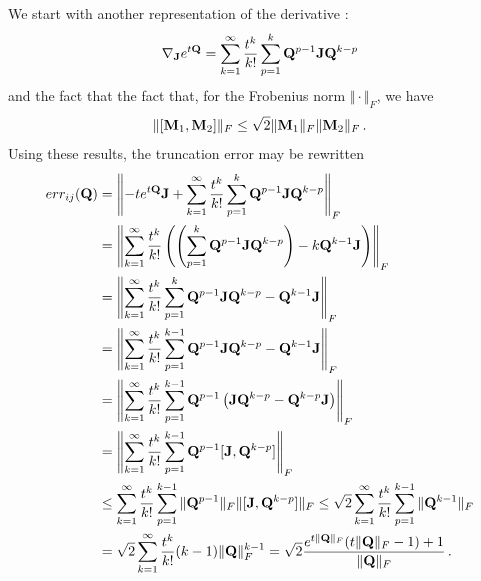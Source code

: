\documentclass[12pt]{article} %
\begin{document}
We start with another representation of the derivative \citep{al2009computing}:
\begin{align*}
	\nabla_{\mathbf{J}} e^{t\mathbf{Q}} = \sum_{k=1}^\infty \frac{t^k}{k!} \sum_{p=1}^k \mathbf{Q}^{p-1} \mathbf{J} \mathbf{Q}^{k-p} 
\end{align*}
and the fact that
the fact that, for the Frobenius norm $\Vert \cdot \Vert_F$, we have \citep{wu2010short}
\begin{align*}
	\Vert [\mathbf{M}_1,\mathbf{M}_2] \Vert_F \leq \sqrt{2} \Vert \mathbf{M}_1 \Vert_F \Vert \mathbf{M}_2\Vert_F \, .
\end{align*}
Using these results, the truncation error may be rewritten
\begin{align*}
	err_{ij}(\mathbf{Q})  &=\left\Vert - te^{t\mathbf{Q}} \mathbf{J}  +  \sum_{k=1}^\infty \frac{t^k}{k!} \sum_{p=1}^k \mathbf{Q}^{p-1} \mathbf{J} \mathbf{Q}^{k-p}\right\Vert_F \\
	&= \left\Vert \sum_{k=1}^\infty \frac{t^k}{k!} \left( \left( \sum_{p=1}^k \mathbf{Q}^{p-1} \mathbf{J} \mathbf{Q}^{k-p} \right) - k \mathbf{Q}^{k-1} \mathbf{J} \right)  \right\Vert_F\\
	&= \left\Vert \sum_{k=1}^\infty \frac{t^k}{k!} \sum_{p=1}^k \mathbf{Q}^{p-1} \mathbf{J} \mathbf{Q}^{k-p}  -  \mathbf{Q}^{k-1} \mathbf{J} \right\Vert_F \\
	&=\left\Vert  \sum_{k=1}^\infty \frac{t^k}{k!} \sum_{p=1}^{k-1} \mathbf{Q}^{p-1} \mathbf{J} \mathbf{Q}^{k-p}  -  \mathbf{Q}^{k-1} \mathbf{J}\right\Vert_F \\
	&=\left\Vert  \sum_{k=1}^\infty \frac{t^k}{k!} \sum_{p=1}^{k-1} \mathbf{Q}^{p-1}\left( \mathbf{J} \mathbf{Q}^{k-p}  -  \mathbf{Q}^{k-p} \mathbf{J} \right)\right\Vert_F \\
	&= \left\Vert  \sum_{k=1}^\infty \frac{t^k}{k!} \sum_{p=1}^{k-1} \mathbf{Q}^{p-1}[\mathbf{J}, \mathbf{Q}^{k-p}] \right\Vert_F  \\
	&\leq  \sum_{k=1}^\infty \frac{t^k}{k!} \sum_{p=1}^{k-1} \Vert \mathbf{Q}^{p-1} \Vert_F \Vert[\mathbf{J}, \mathbf{Q}^{k-p}]\Vert_F 
	\leq \sqrt{2}  \sum_{k=1}^\infty \frac{t^k}{k!} \sum_{p=1}^{k-1} \Vert \mathbf{Q}^{k-1} \Vert_F  \\
	&= \sqrt{2}  \sum_{k=1}^\infty \frac{t^k}{k!} (k-1) \Vert \mathbf{Q} \Vert_F^{k-1} = \sqrt{2} \frac{e^{t\Vert \mathbf{Q}\Vert_F}(t\Vert\mathbf{Q}\Vert_F - 1) + 1}{\Vert \mathbf{Q} \Vert_F} \, .
\end{align*}
\end{document}
